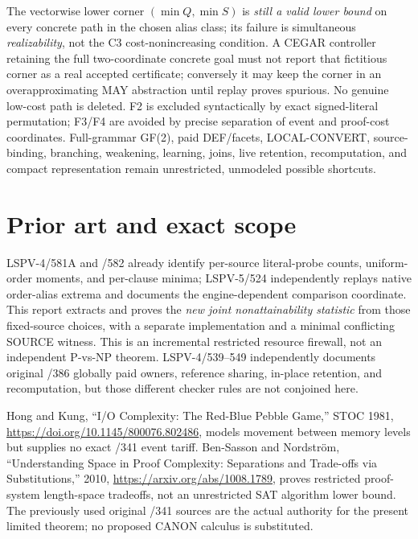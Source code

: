 \documentclass[11pt]{article}
\begin{document}
The vectorwise lower corner \((\min Q,\min S)\) is \emph{still a valid lower bound} on every concrete path in the chosen alias class; its failure is simultaneous \emph{realizability}, not the C3 cost-nonincreasing condition. A CEGAR controller retaining the full two-coordinate concrete goal must not report that fictitious corner as a real accepted certificate; conversely it may keep the corner in an overapproximating MAY abstraction until replay proves spurious. No genuine low-cost path is deleted. F2 is excluded syntactically by exact signed-literal permutation; F3/F4 are avoided by precise separation of event and proof-cost coordinates. Full-grammar GF(2), paid DEF/facets, LOCAL-CONVERT, source-binding, branching, weakening, learning, joins, live retention, recomputation, and compact representation remain unrestricted, unmodeled possible shortcuts.

\section*{Prior art and exact scope}
LSPV-4/581A and /582 already identify per-source literal-probe counts, uniform-order moments, and per-clause minima; LSPV-5/524 independently replays native order-alias extrema and documents the engine-dependent comparison coordinate. This report extracts and proves the \emph{new joint nonattainability statistic} from those fixed-source choices, with a separate implementation and a minimal conflicting SOURCE witness. This is an incremental restricted resource firewall, not an independent P-vs-NP theorem. LSPV-4/539--549 independently documents original /386 globally paid owners, reference sharing, in-place retention, and recomputation, but those different checker rules are not conjoined here.

Hong and Kung, ``I/O Complexity: The Red-Blue Pebble Game,'' STOC 1981, \url{https://doi.org/10.1145/800076.802486}, models movement between memory levels but supplies no exact /341 event tariff. Ben-Sasson and Nordstr\"om, ``Understanding Space in Proof Complexity: Separations and Trade-offs via Substitutions,'' 2010, \url{https://arxiv.org/abs/1008.1789}, proves restricted proof-system length-space tradeoffs, not an unrestricted SAT algorithm lower bound. The previously used original /341 sources are the actual authority for the present limited theorem; no proposed CANON calculus is substituted.
\end{document}
